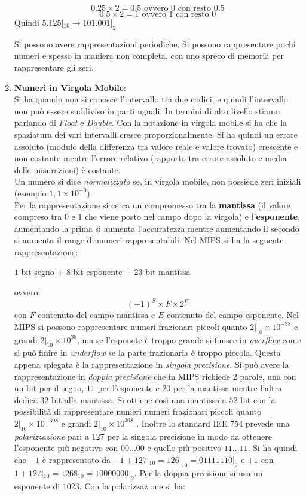 \documentclass[a4paper,12pt, oneside]{book}
\begin{document}
\begin{enumerate}
\begin{esempio}
$$0.25\times 2 = 0.5 \mbox{ ovvero } 0 \mbox{ con resto } 0.5$$
$$0.5\times 2 = 1 \mbox{ ovvero } 1 \mbox{ con resto } 0$$
Quindi $5.125|_{10}\rightarrow 101.001|_{2}$
\end{esempio}
Si possono avere rappresentazioni periodiche. Si possono rappresentare pochi numeri e spesso in maniera non completa, con uno spreco di memoria per rappresentare gli zeri. 
\item \textbf{Numeri in Virgola Mobile}:\\
Si ha quando non si conosce l'intervallo tra due codici, e quindi l'intervallo non può essere suddiviso in parti uguali. In termini di alto livello stiamo parlando di \textit{Float} e \textit{Double}. Con la notazione in virgola mobile si ha che la spaziatura dei vari intervalli cresce proporzionalmente. Si ha quindi un errore assoluto (modulo della differenza tra valore reale e valore trovato) crescente e non costante mentre l'errore relativo (rapporto tra errore assoluto e media delle misurazioni) è costante.\\
Un numero si dice \textit{normalizzato} se, in virgola mobile, non possiede zeri iniziali (esempio $1,1\times 10^{-9}$).\\
Per la rappresentazione si cerca un compromesso tra la \textbf{mantissa} (il valore compreso tra $0$ e $1$ che viene posto nel campo dopo la virgola) e l'\textbf{esponente}, aumentando la prima si aumenta l'accuratezza mentre aumentando il secondo si aumenta il range di numeri rappresentabili. Nel MIPS si ha la seguente rappresentazione:\\
\begin{center}
$1$ bit segno + $8$ bit esponente + $23$ bit mantissa 
\end{center}
ovvero: 
$$(-1)^S\times F\times 2^E$$
con $F$ contenuto del campo mantissa e $E$ contenuto del campo esponente. Nel MIPS si possono rappresentare numeri frazionari piccoli quanto $2|_{10}\times 10^{-38}$ e grandi $2|_{10}\times 10^{38}$, ma se l'esponete è troppo grande si finisce in \textit{overflow} come si può finire in \textit{underflow} se la parte frazionaria è troppo piccola. Questa appena spiegata è la rappresentazione in \textit{singola precisione}. Si può avere la rappresentazione in \textit{doppia precisione} che in MIPS richiede 2 parole, una con un bit per il segno, $11$ per l'esponente e $20$ per la mantissa mentre l'altra dedica $32$ bit alla mantissa. Si ottiene così una mantissa a $52$ bit con la possibilità di rappresentare numeri numeri frazionari piccoli quanto $2|_{10}\times 10^{-308}$ e grandi $2|_{10}\times 10^{308}$ .  Inoltre lo standard IEE 754 prevede una \textit{polarizzazione} pari a $127$ per la singola precisione in modo da ottenere l'esponente più negativo con $00...00$ e quello più positivo $11...11$. Si ha quindi che $-1$  è rappresentato da $-1+127|_{10}=126|_{10}=01111110|_2$ e $+1$ con $1+127|_{10}=1268_{10}=10000000|_2$. Per la doppia precisione si usa un esponente di $1023$. Con la polarizzazione si ha:

\end{enumerate}
\end{document}
